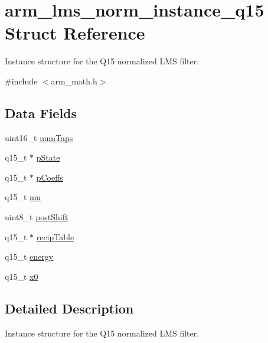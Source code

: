 \hypertarget{structarm__lms__norm__instance__q15}{\section{arm\-\_\-lms\-\_\-norm\-\_\-instance\-\_\-q15 Struct Reference}
\label{structarm__lms__norm__instance__q15}
}


Instance structure for the Q15 normalized L\-M\-S filter.  




{\ttfamily \#include $<$arm\-\_\-math.\-h$>$}

\subsection*{Data Fields}
\begin{DoxyCompactItemize}
\item 
uint16\-\_\-t \hyperlink{structarm__lms__norm__instance__q15_a751941891e47f522a7f5375fe8990aac}{num\-Taps}
\item 
q15\-\_\-t $\ast$ \hyperlink{structarm__lms__norm__instance__q15_ae29dfdb736374fcddaeaec4b7770170c}{p\-State}
\item 
q15\-\_\-t $\ast$ \hyperlink{structarm__lms__norm__instance__q15_a7ca181a37f714d174445f486bebce26f}{p\-Coeffs}
\item 
q15\-\_\-t \hyperlink{structarm__lms__norm__instance__q15_aab4745770bd667de040227eec1b5ff8d}{mu}
\item 
uint8\-\_\-t \hyperlink{structarm__lms__norm__instance__q15_a74050e9f36542bd56f4052381a82ae8f}{post\-Shift}
\item 
q15\-\_\-t $\ast$ \hyperlink{structarm__lms__norm__instance__q15_a39b65b32f68643831304cece01e093bd}{recip\-Table}
\item 
q15\-\_\-t \hyperlink{structarm__lms__norm__instance__q15_ae7a8ccabc82348f6742ca7a2b3da2a41}{energy}
\item 
q15\-\_\-t \hyperlink{structarm__lms__norm__instance__q15_a3c975fed200b19723a2ed11efccca6cd}{x0}
\end{DoxyCompactItemize}


\subsection{Detailed Description}
Instance structure for the Q15 normalized L\-M\-S filter. 

